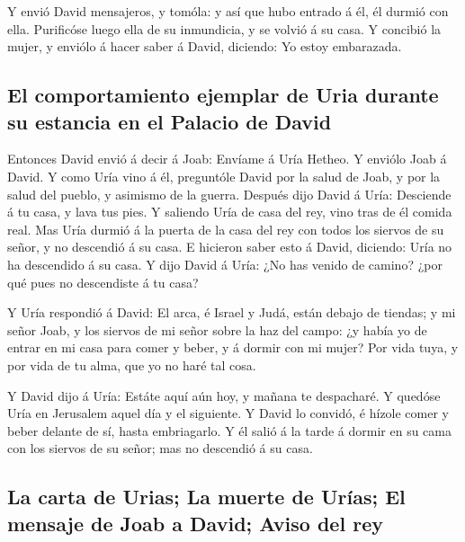  Y envió David mensajeros, y tomóla: y así que hubo
entrado á él, él durmió con ella. Purificóse luego ella de su
inmundicia, y se volvió á su casa.  Y concibió la mujer, y
enviólo á hacer saber á David, diciendo: Yo estoy embarazada.

\hypertarget{el-comportamiento-ejemplar-de-uria-durante-su-estancia-en-el-palacio-de-david}{%
\subsection{El comportamiento ejemplar de Uria durante su estancia en el
Palacio de
David}\label{el-comportamiento-ejemplar-de-uria-durante-su-estancia-en-el-palacio-de-david}}

 Entonces David envió á decir á Joab: Envíame á Uría
Hetheo. Y enviólo Joab á David.  Y como Uría vino á él,
preguntóle David por la salud de Joab, y por la salud del pueblo, y
asimismo de la guerra.  Después dijo David á Uría:
Desciende á tu casa, y lava tus pies. Y saliendo Uría de casa del rey,
vino tras de él comida real.  Mas Uría durmió á la puerta
de la casa del rey con todos los siervos de su señor, y no descendió á
su casa.  E hicieron saber esto á David, diciendo: Uría
no ha descendido á su casa. Y dijo David á Uría: ¿No has venido de
camino? ¿por qué pues no descendiste á tu casa?

 Y Uría respondió á David: El arca, é Israel y Judá,
están debajo de tiendas; y mi señor Joab, y los siervos de mi señor
sobre la haz del campo: ¿y había yo de entrar en mi casa para comer y
beber, y á dormir con mi mujer? Por vida tuya, y por vida de tu alma,
que yo no haré tal cosa.

 Y David dijo á Uría: Estáte aquí aún hoy, y mañana te
despacharé. Y quedóse Uría en Jerusalem aquel día y el siguiente.
 Y David lo convidó, é hízole comer y beber delante de
sí, hasta embriagarlo. Y él salió á la tarde á dormir en su cama con los
siervos de su señor; mas no descendió á su casa.

\hypertarget{la-carta-de-urias-la-muerte-de-uruxedas-el-mensaje-de-joab-a-david-aviso-del-rey}{%
\subsection{La carta de Urias; La muerte de Urías; El mensaje de Joab a
David; Aviso del
rey}\label{la-carta-de-urias-la-muerte-de-uruxedas-el-mensaje-de-joab-a-david-aviso-del-rey}}

